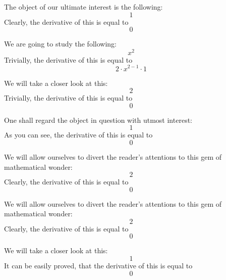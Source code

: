 \documentclass{article}
\begin{document}
The object of our ultimate interest is the following:
\begin{equation}
1 
\end{equation}
Clearly, the derivative of this is equal to
\begin{equation}
0 
\end{equation}

We are going to study the following:
\begin{equation}
x ^{2 } 
\end{equation}
Trivially, the derivative of this is equal to
\begin{equation}
2 \cdot x ^{2 - 1 } \cdot 1 
\end{equation}

We will take a closer look at this:
\begin{equation}
2 
\end{equation}
Trivially, the derivative of this is equal to
\begin{equation}
0 
\end{equation}

One shall regard the object in question with utmost interest:
\begin{equation}
1 
\end{equation}
As you can see, the derivative of this is equal to
\begin{equation}
0 
\end{equation}

We will allow ourselves to divert the reader's attentions to this gem of mathematical wonder:
\begin{equation}
2 
\end{equation}
Clearly, the derivative of this is equal to
\begin{equation}
0 
\end{equation}

We will allow ourselves to divert the reader's attentions to this gem of mathematical wonder:
\begin{equation}
2 
\end{equation}
Clearly, the derivative of this is equal to
\begin{equation}
0 
\end{equation}

We will take a closer look at this:
\begin{equation}
1 
\end{equation}
It can be easily proved, that the derivative of this is equal to
\begin{equation}
0 
\end{equation}
\end{document}
